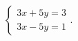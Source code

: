 $\displaystyle
\left\{
\begin{array}{l}
\displaystyle 3x + 5y = 3 \\
\displaystyle 3x - 5y = 1
\end{array}
\right.
$.
